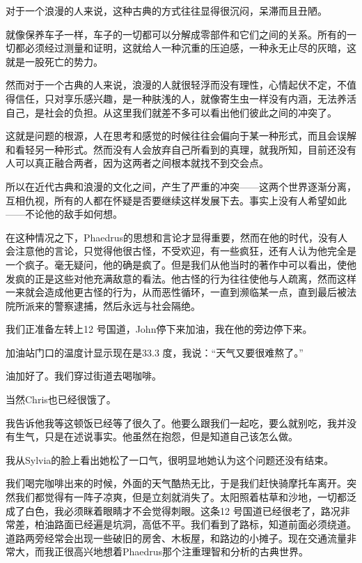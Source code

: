\documentclass[UTF8]{article}
\begin{document}
\par 对于一个浪漫的人来说，这种古典的方式往往显得很沉闷，呆滞而且丑陋。
\par 就像保养车子一样，车子的一切都可以分解成零部件和它们之间的关系。所有的一切都必须经过测量和证明，这就给人一种沉重的压迫感，一种永无止尽的灰暗，这就是一股死亡的势力。
\par 然而对于一个古典的人来说，浪漫的人就很轻浮而没有理性，心情起伏不定，不值得信任，只对享乐感兴趣，是一种肤浅的人，就像寄生虫一样没有内涵，无法养活自己，是社会的负担。从这里我们就差不多可以看出他们彼此之间的冲突了。
\par 这就是问题的根源，人在思考和感觉的时候往往会偏向于某一种形式，而且会误解和看轻另一种形式。然而没有人会放弃自己所看到的真理，就我所知，目前还没有人可以真正融合两者，因为这两者之间根本就找不到交会点。
\par 所以在近代古典和浪漫的文化之间，产生了严重的冲突——这两个世界逐渐分离，互相仇视，所有的人都在怀疑是否要继续这样发展下去。事实上没有人希望如此——不论他的敌手如何想。
\par 在这种情况之下，Phaedrus的思想和言论才显得重要，然而在他的时代，没有人会注意他的言论，只觉得他很古怪，不受欢迎，有一些疯狂，还有人认为他完全是一个疯子。毫无疑问，他的确是疯了。但是我们从他当时的著作中可以看出，使他发疯的正是这些对他充满敌意的看法。他古怪的行为往往使他与人疏离，然而这样一来就会造成他更古怪的行为，从而恶性循环，一直到濒临某一点，直到最后被法院所派来的警察逮捕，然后永远与社会隔绝。
\par 我们正准备左转上12 号国道，John停下来加油，我在他的旁边停下来。
\par 加油站门口的温度计显示现在是33.3 度，我说：“天气又要很难熬了。”
\par 油加好了。我们穿过街道去喝咖啡。
\par 当然Chris也已经很饿了。
\par 我告诉他我等这顿饭已经等了很久了。他要么跟我们一起吃，要么就别吃，我并没有生气，只是在述说事实。他虽然在抱怨，但是知道自己该怎么做。
\par 我从Sylvia的脸上看出她松了一口气，很明显地她认为这个问题还没有结束。
\par 我们喝完咖啡出来的时候，外面的天气酷热无比，于是我们赶快骑摩托车离开。突然我们都觉得有一阵子凉爽，但是立刻就消失了。太阳照着枯草和沙地，一切都泛成了白色，我必须眯着眼睛才不会觉得刺眼。这条12 号国道已经很老了，路况非常差，柏油路面已经遍是坑洞，高低不平。我们看到了路标，知道前面必须绕道。道路两旁经常会出现一些破旧的房舍、木板屋，和路边的小摊子。现在交通流量非常大，而我正很高兴地想着Phaedrus那个注重理智和分析的古典世界。
\end{document}
